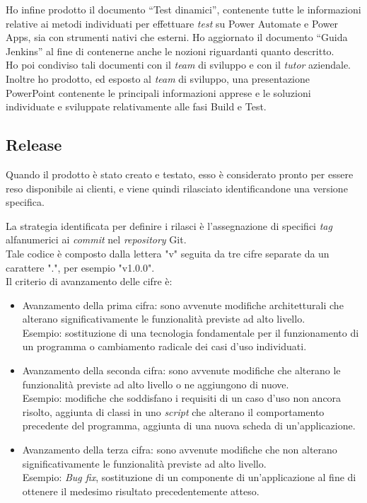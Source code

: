 Ho infine prodotto il documento “Test dinamici”, contenente tutte le informazioni relative ai metodi individuati per effettuare \emph{test} su Power Automate e Power Apps, sia con strumenti nativi che esterni.
Ho aggiornato il documento “Guida Jenkins” al fine di contenerne anche le nozioni riguardanti quanto descritto.\\
Ho poi condiviso tali documenti con il \emph{team} di sviluppo e con il \emph{\emph{tutor}} aziendale.\\
Inoltre ho prodotto, ed esposto al \emph{team} di sviluppo, una presentazione PowerPoint contenente le principali informazioni apprese e le soluzioni individuate e sviluppate relativamente alle fasi Build e Test. 


\subsection{Release}
Quando il prodotto è stato creato e testato, esso è considerato pronto per essere reso disponibile ai clienti, e viene quindi rilasciato identificandone una versione specifica.

La strategia identificata per definire i rilasci è l'assegnazione di specifici \emph{tag} alfanumerici ai \emph{commit} nel \emph{repository} Git.\\
Tale codice è composto dalla lettera "v" seguita da tre cifre separate da un carattere ".", per esempio "v1.0.0".\\
Il criterio di avanzamento delle cifre è: 
\begin{itemize}
    \item Avanzamento della prima cifra: sono avvenute modifiche architetturali che alterano significativamente le funzionalità previste ad alto livello.\\
    Esempio: sostituzione di una tecnologia fondamentale per il funzionamento di un programma o cambiamento radicale dei casi d'uso individuati.  
    \item Avanzamento della seconda cifra: sono avvenute modifiche che alterano le funzionalità previste ad alto livello o ne aggiungono di nuove.\\
    Esempio: modifiche che soddisfano i requisiti di un caso d'uso non ancora risolto, aggiunta di classi in uno \emph{script} che alterano il comportamento precedente del programma, aggiunta di una nuova scheda di un'applicazione.
    \item Avanzamento della terza cifra: sono avvenute modifiche che non alterano significativamente le funzionalità previste ad alto livello.\\
    Esempio: \emph{Bug fix}, sostituzione di un componente di un'applicazione al fine di ottenere il medesimo risultato precedentemente atteso. 
\end{itemize}
    

